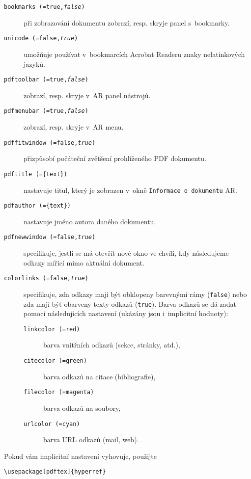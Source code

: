 \begin{flushleft}
\begin{description}
  \item [\texttt{bookmarks (=true,\textit{false})}] při zobrazování
   dokumentu zobrazí, resp. skryje panel s~bookmarky.
  \item [\texttt{unicode (=false,\textit{true})}] umožňuje používat
    v~bookmarcích Acrobat Readeru znaky nelatinkových jazyků.
  \item [\texttt{pdftoolbar (=true,\textit{false})}] zobrazí, resp.
    skryje v~AR panel nástrojů.
  \item [\texttt{pdfmenubar (=true,\textit{false})}] zobrazí, resp.
    skryje v~AR menu.
  \item [\texttt{pdffitwindow (=false,\textit{true})}] přizpůsobí
    počáteční zvětšení prohlíženého PDF dokumentu.
  \item [\texttt{pdftitle (=\{text\})}] nastavuje titul, který je
    zobrazen v~okně \texttt{Informace o~dokumentu} AR.
  \item [\texttt{pdfauthor (=\{text\})}] nastavuje jméno autora
    daného dokumentu.
  \item [\texttt{pdfnewwindow (=false,\textit{true})}] specifikuje,
    jestli se má otevřít nové okno ve chvíli, kdy následujeme odkazy
    mířící mimo aktuální dokument.
  \item [\texttt{colorlinks (=false,\textit{true})}] specifikuje,
    zda odkazy mají být obklopeny barevnými rámy (\texttt{false})
    nebo zda mají být obarveny texty odkazů (\texttt{true}). Barva
    odkazů se dá zadat pomocí následujících nastavení (ukázány
    jsou i~implicitní hodnoty):
    \begin{description}
    \item [\texttt{linkcolor (=red)}] barva vnitřních odkazů
      (sekce, stránky, atd.),
    \item [\texttt{citecolor (=green)}] barva odkazů na citace
      (bibliografie),
    \item [\texttt{filecolor (=magenta)}] barva odkazů na soubory,
    \item [\texttt{urlcolor (=cyan)}] barva URL odkazů
      (mail, web).
    \end{description}
\end{description}
\end{flushleft}

Pokud vám implicitní nastavení vyhovuje, použijte
\begin{code}
\begin{verbatim}
\usepackage[pdftex]{hyperref}
\end{verbatim}
\end{code}

